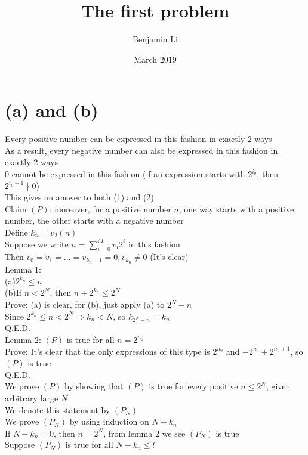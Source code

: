 \documentclass{article}
\title{The first problem}
\author{Benjamin Li}
\date{March 2019}
\begin{document}

\maketitle

\section{(a) and (b)}
Every positive number can be expressed in this fashion in exactly 2 ways\\
As a result, every negative number can also be expressed in this fashion in exactly 2 ways\\
0 cannot be expressed in this fashion (if an expression starts with $2^{i_0}$, then $2^{i_0+1}\nmid 0$)\\
This gives an answer to both (1) and (2)\\[22pt]
Claim $(P)$: moreover, for a positive number $n$, one way starts with a positive number, the other starts with a negative number\\
Define $k_n=v_2(n)$\\
Suppose we write $n=\sum\limits_{i=0}^{M} v_i 2^i$ in this fashion\\
Then $v_0=v_1=...=v_{k_n-1}=0,v_{k_n}\ne 0$ (It's clear)\\
Lemma 1:\\
(a)$2^{k_n}\le n$\\
(b)If $n<2^N$, then $n+2^{k_n}\le 2^N$\\
Prove: (a) is clear, for (b), just apply (a) to $2^N-n$\\
Since $2^{k_n}\le n<2^N\Rightarrow k_n<N$, so $k_{2^N-n}=k_n$\\
Q.E.D.\\
Lemma 2: $(P)$ is true for all $n=2^{n_0}$\\
Prove: It's clear that the only expressions of this type is $2^{n_0}$ and $-2^{n_0}+2^{n_0+1}$, so $(P)$ is true\\
Q.E.D.\\
We prove $(P)$ by showing that $(P)$ is true for every positive $n\le 2^N$, given arbitrary large $N$\\
We denote this statement by $(P_N)$\\
We prove $(P_N)$ by using induction on $N-k_n$\\
If $N-k_n=0$, then $n=2^N$, from lemma 2 we see $(P_N)$ is true\\
Suppose $(P_N)$ is true for all $N-k_n\le l$\\
\end{document}
